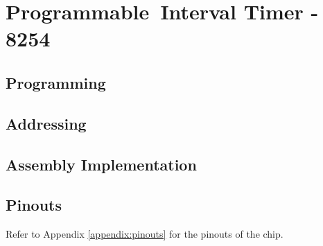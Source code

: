 \newpage
\section{Programmable Interval Timer - 8254}

    \subsection{Programming}

    \subsection{Addressing}

    \subsection{Assembly Implementation}

    \subsection{Pinouts}
    Refer to Appendix \ref{appendix:pinouts} for the pinouts of the chip.
